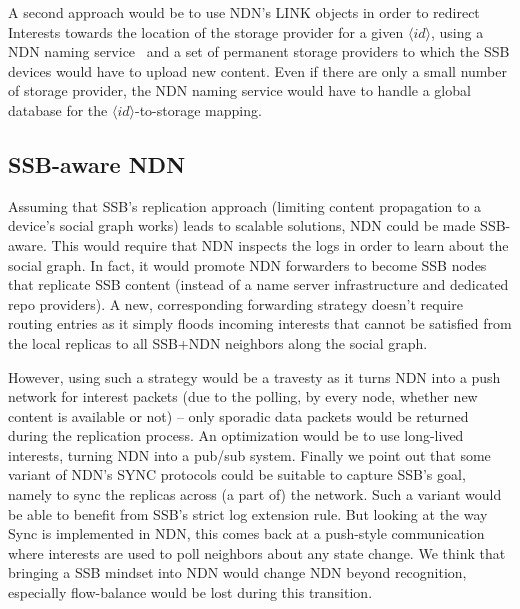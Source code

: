 \documentclass[9pt,sigconf,rewiew]{acmart}
\begin{document}
A second approach would be to use NDN's LINK objects in order to redirect
Interests towards the location of the storage provider for a given
$\langle id\rangle$, using a NDN naming service~\cite{DBLP:conf/icccn/AfanasyevJYTXM017} and a set of
permanent storage providers to which the SSB devices would
have to upload new content.
Even if there are only a small number of storage provider,
the NDN naming service would have to
handle a global database for the $\langle id\rangle$-to-storage
mapping.



\subsection{SSB-aware NDN}

Assuming that SSB's replication approach (limiting content propagation
to a device's social graph works) leads to scalable solutions, NDN
could be made SSB-aware. This would require that NDN inspects the logs
in order to learn about the social graph. In fact, it would promote
NDN forwarders to become SSB nodes that replicate SSB content (instead
of a name server infrastructure and dedicated repo providers). A new,
corresponding forwarding strategy doesn't require routing entries as
it simply floods incoming interests that cannot be satisfied from the
local replicas to all SSB+NDN neighbors along the social graph.

However, using such a strategy would be a travesty as it turns NDN
into a push network for interest packets (due to the polling, by every
node, whether new content is available or not) -- only sporadic data
packets would be returned during the replication process. An
optimization would be to use long-lived interests, turning NDN into a
pub/sub system. Finally we point out that some variant of NDN's SYNC
protocols could be suitable to capture SSB's goal, namely to sync the
replicas across (a part of) the network. Such a variant would be able
to benefit from SSB's strict log extension rule. But looking at the
way Sync is implemented in NDN, this comes back at a push-style
communication where interests are used to poll neighbors about any
state change. We think that bringing a SSB mindset into NDN would
change NDN beyond recognition, especially flow-balance would be
lost during this transition.
\end{document}
